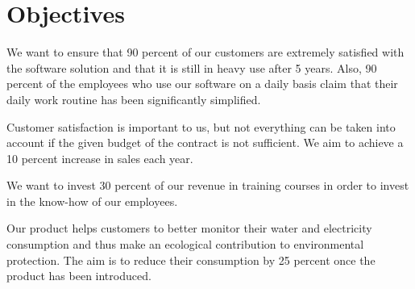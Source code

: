 \section{Objectives}
\label{sec:orgff22d59}


We want to ensure that 90 percent of our customers are extremely satisfied with
the software solution and that it is still in heavy use after 5 years. Also, 90
percent of the employees who use our software on a daily basis claim that their
daily work routine has been significantly simplified.

Customer satisfaction is important to us, but not everything can be taken into
account if the given budget of the contract is not sufficient. We aim to achieve
a 10 percent increase in sales each year.

We want to invest 30 percent of our revenue in training courses in order to
invest in the know-how of our employees.

Our product helps customers to better monitor their water and electricity
consumption and thus make an ecological contribution to environmental
protection. The aim is to reduce their consumption by 25 percent once the
product has been introduced.

